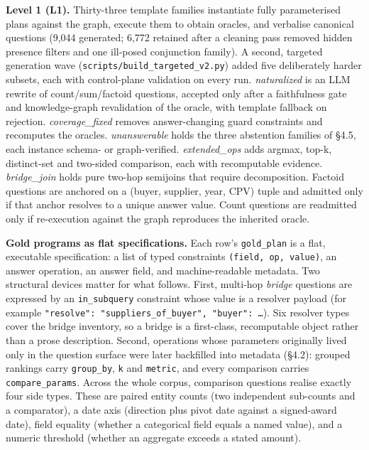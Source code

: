 \documentclass[10pt]{article} %
\begin{document}
\textbf{Level 1 (L1).} Thirty-three template families instantiate fully parameterised plans against the graph, execute them to obtain oracles, and verbalise canonical questions (9,044 generated; 6,772 retained after a cleaning pass removed hidden presence filters and one ill-posed conjunction family). A second, targeted generation wave (\texttt{scripts/build\_targeted\_v2.py}) added five deliberately harder subsets, each with control-plane validation on every run. \emph{naturalized} is an LLM rewrite of count/sum/factoid questions, accepted only after a faithfulness gate and knowledge-graph revalidation of the oracle, with template fallback on rejection. \emph{coverage\_fixed} removes answer-changing guard constraints and recomputes the oracles. \emph{unanswerable} holds the three abstention families of \S4.5, each instance schema- or graph-verified. \emph{extended\_ops} adds argmax, top-k, distinct-set and two-sided comparison, each with recomputable evidence. \emph{bridge\_join} holds pure two-hop semijoins that require decomposition. Factoid questions are anchored on a (buyer, supplier, year, CPV) tuple and admitted only if that anchor resolves to a unique answer value. Count questions are readmitted only if re-execution against the graph reproduces the inherited oracle.

\textbf{Gold programs as flat specifications.} Each row's \texttt{gold\_plan} is a flat, executable specification: a list of typed constraints \texttt{(field, op, value)}, an answer operation, an answer field, and machine-readable metadata. Two structural devices matter for what follows. First, multi-hop \emph{bridge} questions are expressed by an \texttt{in\_subquery} constraint whose value is a resolver payload (for example \texttt{{"resolve": "suppliers\_of\_buyer", "buyer": \ldots{}}}). Six resolver types cover the bridge inventory, so a bridge is a first-class, recomputable object rather than a prose description. Second, operations whose parameters originally lived only in the question surface were later backfilled into metadata (\S4.2): grouped rankings carry \texttt{group\_by}, \texttt{k} and \texttt{metric}, and every comparison carries \texttt{compare\_params}. Across the whole corpus, comparison questions realise exactly four side types. These are paired entity counts (two independent sub-counts and a comparator), a date axis (direction plus pivot date against a signed-award date), field equality (whether a categorical field equals a named value), and a numeric threshold (whether an aggregate exceeds a stated amount).
\end{document}
